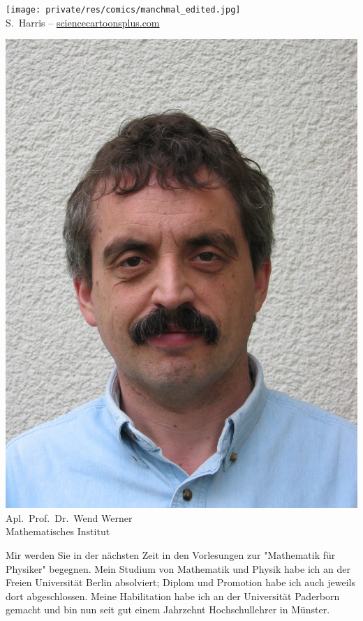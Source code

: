 \begin{multicols}{2}
\begin{center}
\texttt{[image: private/res/comics/manchmal\_edited.jpg]}\\
{\footnotesize 
S.~Harris – \url{sciencecartoonsplus.com}
}
\end{center}

\end{multicols}

\vfill

\newpage

\begin{multicols}{2}
\begin{center}
	\includegraphics[width=\columnwidth, height=0.35\textheight]{res/vorstellungsfotos/wend_werner.jpg}\\
\smallskip
	Apl.\ Prof.\ Dr.\ Wend Werner\\
	Mathematisches Institut
\end{center}

Mir werden Sie in der nächsten Zeit in den Vorlesungen zur "Mathematik für Physiker" begegnen.
Mein Studium von Mathematik und Physik habe ich an der Freien Universität Berlin absolviert; Diplom und Promotion habe ich auch jeweils dort abgeschlossen.
Meine Habilitation habe ich an der Universität Paderborn gemacht und bin nun seit gut einem Jahrzehnt Hochschullehrer in Münster.


\end{multicols}
